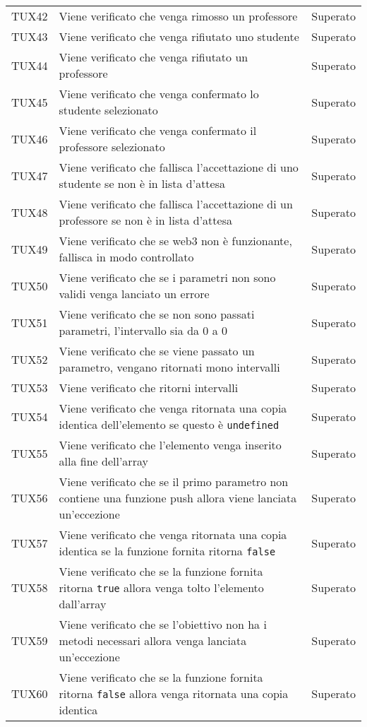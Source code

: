 \documentclass[PianoDiQualifica.tex]{subfiles}
\begin{document}
\begin{longtable}[H]{P{2cm}P{8.5cm}P{3cm}}
	TUX42 & Viene verificato che venga rimosso un professore & Superato \\
	TUX43 & Viene verificato che venga rifiutato uno studente & Superato \\
	TUX44 & Viene verificato che venga rifiutato un professore & Superato \\
	TUX45 & Viene verificato che venga confermato lo studente selezionato & Superato \\
	TUX46 & Viene verificato che venga confermato il professore selezionato & Superato \\
	TUX47 & Viene verificato che fallisca l'accettazione di uno studente se non è in lista d'attesa & Superato \\
	TUX48 & Viene verificato che fallisca l'accettazione di un professore se non è in lista d'attesa & Superato \\
	TUX49 & Viene verificato che se web3 non è funzionante, fallisca in modo controllato & Superato \\
	TUX50 & Viene verificato che se i parametri non sono validi venga lanciato un errore & Superato \\
	TUX51 & Viene verificato che se non sono passati parametri, l'intervallo sia da 0 a 0 & Superato \\
	TUX52 & Viene verificato che se viene passato un parametro, vengano ritornati mono intervalli  & Superato \\
	TUX53 & Viene verificato che ritorni intervalli & Superato \\
	TUX54 & Viene verificato che venga ritornata una copia identica dell'elemento se questo è \texttt{undefined} & Superato \\
	TUX55 & Viene verificato che l'elemento venga inserito alla fine dell'array & Superato \\
	TUX56 & Viene verificato che se il primo parametro non contiene una funzione push allora viene lanciata un'eccezione & Superato \\
	TUX57 & Viene verificato che venga ritornata una copia identica se la funzione fornita ritorna \texttt{false} & Superato \\
	TUX58 & Viene verificato che se la funzione fornita ritorna \texttt{true} allora venga tolto l'elemento dall'array & Superato \\
	TUX59 & Viene verificato che se l'obiettivo non ha i metodi necessari allora venga lanciata un'eccezione & Superato \\
	TUX60 & Viene verificato che se la funzione fornita ritorna \texttt{false} allora venga ritornata una copia identica & Superato \\

\end{longtable}
\end{document}
